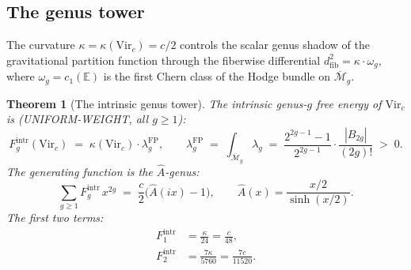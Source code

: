 \documentclass[11pt,reqno]{amsart}
\newtheorem{theorem}{Theorem}[section]
\theoremstyle{definition}
\theoremstyle{remark}
\begin{document}
\subsection{The genus tower}

The curvature $\kappa = \kappa(\mathrm{Vir}_c) = c/2$ controls the
scalar genus shadow of the gravitational partition function through the
fiberwise differential $d_{\mathrm{fib}}^2 = \kappa \cdot \omega_g$,
where $\omega_g = c_1(\mathbb{E})$ is the first Chern class of the
Hodge bundle on $\overline{\mathcal{M}}_g$.

\begin{theorem}[The intrinsic genus tower]
\label{thm:genus-tower}
The intrinsic genus-$g$ free energy of\/ $\mathrm{Vir}_c$ is
(UNIFORM-WEIGHT, all $g \ge 1$):
\begin{equation}\label{eq:Fg}
F_g^{\mathrm{intr}}(\mathrm{Vir}_c) \;=\;
\kappa(\mathrm{Vir}_c) \cdot \lambda_g^{\mathrm{FP}},
\qquad
\lambda_g^{\mathrm{FP}} \;=\;
\int_{\overline{\mathcal{M}}_g} \lambda_g
\;=\;
\frac{2^{2g-1}-1}{2^{2g-1}} \cdot
\frac{|B_{2g}|}{(2g)!}
\;>\; 0.
\end{equation}
The generating function is the\/ $\hat{A}$-genus:
\begin{equation}\label{eq:genus-generating}
\sum_{g \ge 1} F_g^{\mathrm{intr}}\,x^{2g}
\;=\;
\frac{c}{2}\bigl(\hat{A}(ix) - 1\bigr),
\qquad
\hat{A}(x) = \frac{x/2}{\sinh(x/2)}.
\end{equation}
The first two terms:
\begin{align}
F_1^{\mathrm{intr}} &= \frac{\kappa}{24}
  = \frac{c}{48}, \label{eq:F1} \\
F_2^{\mathrm{intr}} &= \frac{7\kappa}{5760}
  = \frac{7c}{11520}. \label{eq:F2}
\end{align}
\end{theorem}
\end{document}
